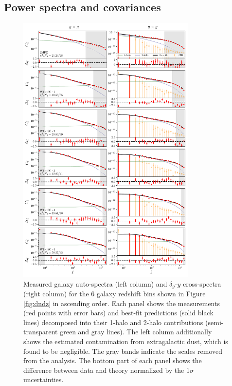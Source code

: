 \documentclass[useAMS,usenatbib]{mn2e}
\begin{document}
  \subsection{Power spectra and covariances}\label{ssec:results.cls}
  \begin{figure}
    \centering
    \includegraphics[width=0.8\textwidth]{fits.pdf}
    \caption{Measured galaxy auto-spectra (left column) and $\delta_g$-$y$ cross-spectra (right column) for the 6 galaxy redshift bins shown in Figure \ref{fig:dndz} in ascending order. Each panel shows the measurements (red points with error bars) and best-fit predictions (solid black lines) decomposed into their 1-halo and 2-halo contributions (semi-transparent green and gray lines). The left column additionally shows the estimated contamination from extragalactic dust, which is found to be negligible. The gray bands indicate the scales removed from the analysis. The bottom part of each panel shows the difference between data and theory normalized by the 1$\sigma$ uncertainties.}
    \label{fig:cls}
  \end{figure}
\end{document}
